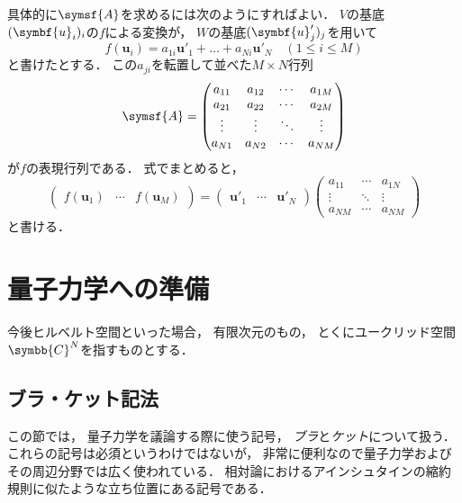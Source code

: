 \documentclass[
]{sotsu}
\begin{document}
具体的に$\symsf{A}$を求めるには次のようにすればよい．
$V$の基底$\sequ{\symbf{u}_i}[i]$の$f$による変換が，
$W$の基底$\sequ{\symbf{u}'_j}[j]$を用いて
\begin{equation*}
    f(\symbf{u}_i) = a_{1i} \symbf{u}'_1 + \dots + a_{Ni} \symbf{u}'_N
    \quad 
    (1 \leq i \leq M)
\end{equation*}
と書けたとする．
この$a_{ji}$を転置して並べた$M \times N$行列
\begin{equation*}
    \symsf{A} = 
    \begin{pmatrix}
        a_{11}  &  a_{12}  &  \cdots  &  a_{1M}  \\
        a_{21}  &  a_{22}  &  \cdots  &  a_{2M}  \\
        \vdots  &  \vdots  &  \ddots  &  \vdots  \\
        a_{N1}  &  a_{N2}  &  \cdots  &  a_{NM}
    \end{pmatrix}
\end{equation*}
が$f$の表現行列である．
式でまとめると，
\begin{equation*}
    \begin{pmatrix}
        f(\symbf{u}_1)  &  \cdots  &  f(\symbf{u}_M)
    \end{pmatrix}
    =
    \begin{pmatrix}
        \symbf{u}'_1  &  \cdots  &  \symbf{u}'_N
    \end{pmatrix}
    \begin{pmatrix}
        a_{11}  &  \cdots  &  a_{1N}  \\
        \vdots  &  \ddots  &  \vdots  \\
        a_{NM}  &  \cdots  &  a_{NM}
    \end{pmatrix}
\end{equation*}
と書ける．



\section{量子力学への準備}

今後ヒルベルト空間といった場合，
有限次元のもの，
とくにユークリッド空間$\symbb{C}^N$を指すものとする．


\subsection{ブラ・ケット記法}

この節では，
量子力学を議論する際に使う記号，
\emph{ブラ}と\emph{ケット}について扱う．
これらの記号は必須というわけではないが，
非常に便利なので量子力学およびその周辺分野では広く使われている．
相対論におけるアインシュタインの縮約規則に似たような立ち位置にある記号である．
\end{document}
